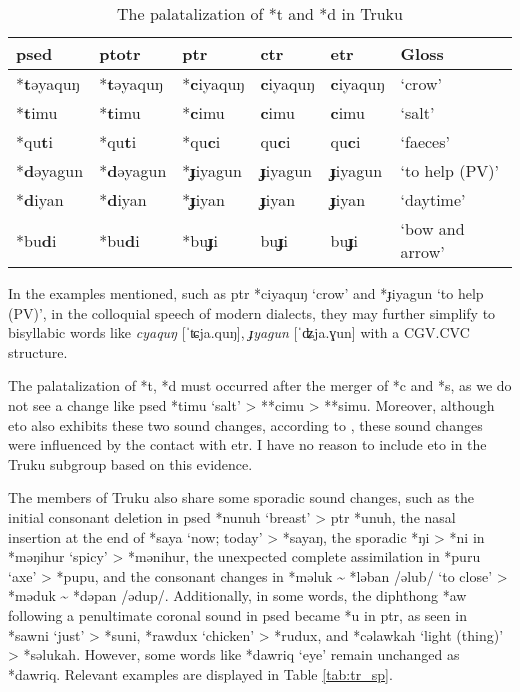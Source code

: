 \begin{table}[!htbp]
\centering
\caption{The palatalization of *t and *d in Truku}
\label{tab:trtdpal}
\begin{tabular}{llllll}
\hline
\ac{psed}      & \ac{ptotr}   & \ac{ptr}     & \acs{ctr}   & \acs{etr}   & Gloss               \\ \hline
*\textbf{t}əyaquŋ  & *\textbf{t}əyaquŋ  & *\textbf{c}iyaquŋ  & \textbf{c}iyaquŋ   & \textbf{c}iyaquŋ   & `crow'          \\
*\textbf{t}imu  & *\textbf{t}imu  & *\textbf{c}imu  & \textbf{c}imu   & \textbf{c}imu   & `salt'          \\
*qu\textbf{t}i  & *qu\textbf{t}i  & *qu\textbf{c}i  & qu\textbf{c}i   & qu\textbf{c}i   & `faeces'        \\
*\textbf{d}əyagun & *\textbf{d}əyagun & *\textbf{ɟ}iyagun & \textbf{ɟ}iyagun  & \textbf{ɟ}iyagun  & `to help (PV)'       \\
*\textbf{d}iyan & *\textbf{d}iyan & *\textbf{ɟ}iyan & \textbf{ɟ}iyan  & \textbf{ɟ}iyan  & `daytime'       \\
*bu\textbf{d}i  & *bu\textbf{d}i  & *bu\textbf{ɟ}i  & bu\textbf{ɟ}i   & bu\textbf{ɟ}i   & `bow and arrow' \\ \hline
\end{tabular}
\end{table}

In the examples mentioned, such as \acl{ptr} *ciyaquŋ `crow' and *ɟiyagun `to help (PV)', in the colloquial speech of modern dialects, they may further simplify to bisyllabic words like \textit{cyaquŋ} [ˈʨja.quŋ], \textit{ɟyagun} [ˈʥja.ɣun] with a CGV.CVC structure.

The palatalization of *t, *d must occurred after the merger of *c and *s, as we do not see a change like \acl{psed} *timu `salt' > **cimu > **simu. Moreover, although \acl{eto} also exhibits these two sound changes, according to \textcite{lee2015tawsa}, these sound changes were influenced by the contact with \acl{etr}. I have no reason to include \acl{eto} in the Truku subgroup based on this evidence. 

The members of Truku also share some sporadic sound changes, such as the initial consonant deletion in \acl{psed} *nunuh `breast' > \acl{ptr} *unuh, the nasal insertion at the end of *saya `now; today' > *sayaŋ, the sporadic *ŋi > *ni in *məŋihur `spicy' > *mənihur, the unexpected complete assimilation in *puru `axe' > *pupu, and the consonant changes in *məluk \~{} *ləban /əlub/ `to close' > *məduk \~{} *dəpan /ədup/. Additionally, in some words, the diphthong *aw following a penultimate coronal sound in \acl{psed} became *u in \acl{ptr}, as seen in *sawni `just' > *suni, *rawdux `chicken' > *rudux, and *cəlawkah `light (thing)' > *səlukah. However, some words like *dawriq `eye' remain unchanged as *dawriq. Relevant examples are displayed in Table \ref{tab:tr_sp}.

